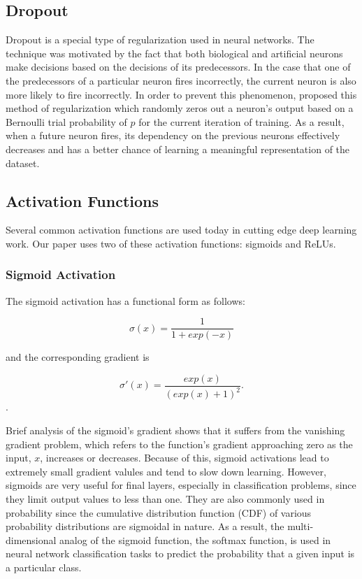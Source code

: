 \subsection{Dropout}
Dropout is a special type of regularization used in neural networks. The technique was motivated by the fact that both biological and artificial neurons make decisions based on the decisions of its predecessors. In the case that one of the predecessors of a particular neuron fires incorrectly, the current neuron is also more likely to fire incorrectly. In order to prevent this phenomenon, \citet{dropout} proposed this method of regularization which randomly zeros out a neuron's output based on a Bernoulli trial probability of $p$ for the current iteration of training. As a result, when a future neuron fires, its dependency on the previous neurons effectively decreases and has a better chance of learning a meaningful representation of the dataset. 


\subsection{Activation Functions}
\label{activationfunctions}

Several common activation functions are used today in cutting edge deep learning work. Our paper uses two of these activation functions: sigmoids and ReLUs. 
\subsubsection*{Sigmoid Activation}

The sigmoid activation has a functional form as follows: 

\begin{equation}
	\sigma(x) = \frac{1}{1 + exp(-x)}
\end{equation}

\noindent
and the corresponding gradient is 

\begin{equation}
	\sigma ' (x)  = \frac{exp(x)}{(exp(x) + 1)^2}.
\end{equation}. 

Brief analysis of the sigmoid's gradient shows that it suffers from the vanishing gradient problem, which refers to the function's gradient approaching zero as the input, $x$, increases or decreases. Because of this, sigmoid activations lead to extremely small gradient valules and tend to slow down learning. However, sigmoids are very useful for final layers, especially in classification problems, since they limit output values to less than one. They are also commonly used in probability since the cumulative distribution function (CDF) of various probability distributions are sigmoidal in nature. As a result, the multi-dimensional analog of the sigmoid function, the softmax function, is used in neural network classification tasks to predict the probability that a given input is a particular class. 

